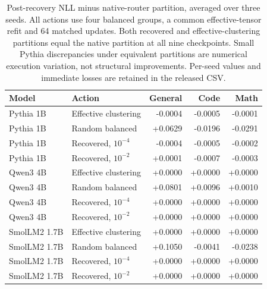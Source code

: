 \begin{table}[t]
\centering\small
\caption{Post-recovery NLL minus native-router partition, averaged over three seeds. All actions use four balanced groups, a common effective-tensor refit and 64 matched updates. Both recovered and effective-clustering partitions equal the native partition at all nine checkpoints. Small Pythia discrepancies under equivalent partitions are numerical execution variation, not structural improvements. Per-seed values and immediate losses are retained in the released CSV.}
\label{tab:llm-decisions}
\begin{tabular}{llrrr}
\toprule
Model & Action & General & Code & Math\\
\midrule
Pythia 1B & Effective clustering & -0.0004 & -0.0005 & -0.0001\\
Pythia 1B & Random balanced & +0.0629 & -0.0196 & -0.0291\\
Pythia 1B & Recovered, $10^{-4}$ & -0.0004 & -0.0005 & -0.0002\\
Pythia 1B & Recovered, $10^{-2}$ & +0.0001 & -0.0007 & -0.0003\\
Qwen3 4B & Effective clustering & +0.0000 & +0.0000 & +0.0000\\
Qwen3 4B & Random balanced & +0.0801 & +0.0096 & +0.0010\\
Qwen3 4B & Recovered, $10^{-4}$ & +0.0000 & +0.0000 & +0.0000\\
Qwen3 4B & Recovered, $10^{-2}$ & +0.0000 & +0.0000 & +0.0000\\
SmolLM2 1.7B & Effective clustering & +0.0000 & +0.0000 & +0.0000\\
SmolLM2 1.7B & Random balanced & +0.1050 & -0.0041 & -0.0238\\
SmolLM2 1.7B & Recovered, $10^{-4}$ & +0.0000 & +0.0000 & +0.0000\\
SmolLM2 1.7B & Recovered, $10^{-2}$ & +0.0000 & +0.0000 & +0.0000\\
\bottomrule
\end{tabular}
\end{table}
